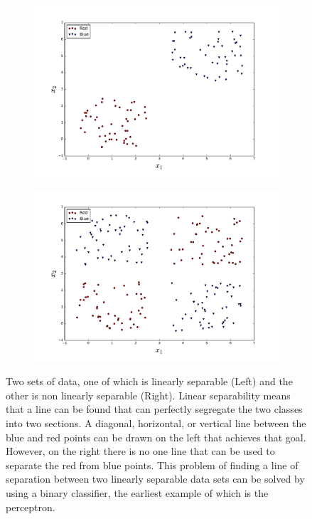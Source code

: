 \begin{figure}[!h]
  \centering
  \begin{subfigure}{.49\textwidth}
    \centering
    \includegraphics[width=\linewidth]{figures/twoClasses_separable.pdf}
  \end{subfigure} %
  \begin{subfigure}{0.49\textwidth}
    \centering
    \includegraphics[width=\linewidth]{figures/twoClasses_non_separable.pdf}
  \end{subfigure}
  \caption{Two sets of data, one of which is linearly separable (Left) and the other is non linearly separable (Right). Linear separability means that a line can be found that can perfectly segregate the two classes into two sections. A diagonal, horizontal, or vertical line between the blue and red points can be drawn on the left that achieves that goal. However, on the right there is no one line that can be used to separate the red from blue points. This problem of finding a line of separation between two linearly separable data sets can be solved by using a binary classifier, the earliest example of which is the perceptron.}
  \label{fig:two_classes_example}
\end{figure}


